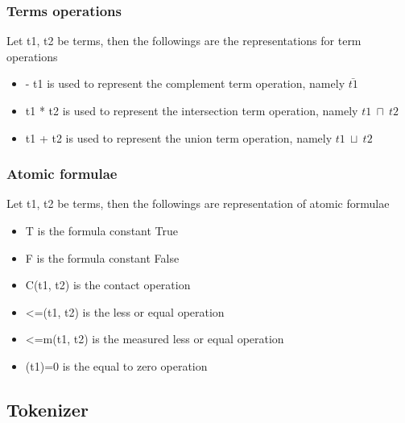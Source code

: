 \documentclass{article}
\begin{document}
		\subsubsection*{Terms operations}
		Let t1, t2 be terms, then the followings are the representations for term operations
		\begin{itemize}
			\item - t1 is used to represent the complement term operation, namely $\bar{t1}$
			\item t1 * t2 is used to represent the intersection term operation, namely $t1 \: \sqcap \: t2$
			\item t1 + t2 is used to represent the union term operation, namely $t1 \: \sqcup \: t2$
		\end{itemize}
		
		\subsubsection*{Atomic formulae}
		Let t1, t2 be terms, then the followings are representation of atomic formulae
		\begin{itemize}
			\item T is the formula constant True
			\item F is the formula constant False
			\item C(t1, t2) is the contact operation
			\item <=(t1, t2) is the less or equal operation
			\item <=m(t1, t2) is the measured less or equal operation
			\item (t1)=0 is the equal to zero operation
		\end{itemize}

	\subsection{Tokenizer}
\end{document}
